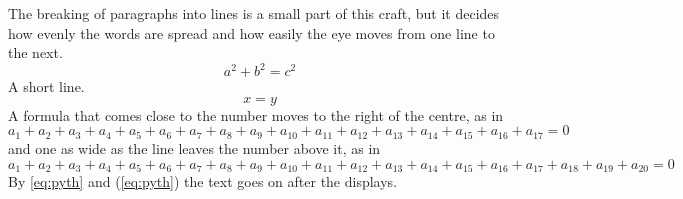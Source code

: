 \documentclass{amsart}
\begin{document}
The breaking of paragraphs into lines is a small part of this craft, but it decides how evenly the words are spread and how easily the eye moves from one line to the next.
\begin{equation}\label{eq:pyth}
a^2+b^2=c^2
\end{equation}
A short line.
\begin{equation}
x=y
\end{equation}
A formula that comes close to the number moves to the right of the centre, as in
\begin{equation}
a_1+a_2+a_3+a_4+a_5+a_6+a_7+a_8+a_9+a_{10}+a_{11}+a_{12}+a_{13}+a_{14}+a_{15}+a_{16}+a_{17}=0
\end{equation}
and one as wide as the line leaves the number above it, as in
\begin{equation}
a_1+a_2+a_3+a_4+a_5+a_6+a_7+a_8+a_9+a_{10}+a_{11}+a_{12}+a_{13}+a_{14}+a_{15}+a_{16}+a_{17}+a_{18}+a_{19}+a_{20}=0
\end{equation}
By \eqref{eq:pyth} and (\ref{eq:pyth}) the text goes on after the displays.
\end{document}
